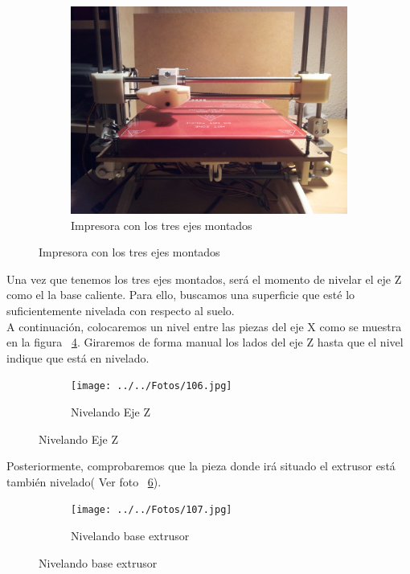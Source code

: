 		\begin{figure}[H]
		        \centering
		        \begin{subfigure}[htb]{0.5\textwidth}
		                \centering
		                \includegraphics[width=\textwidth]{../../Fotos/94.jpg}
		                \caption{Impresora con los tres ejes montados}
		                \label{fig:23.z}
		        \end{subfigure}
		\end{figure}
		Una vez que tenemos los tres ejes montados, será el momento de nivelar  el eje Z como el la base caliente. Para ello, buscamos una superficie que esté lo suficientemente nivelada con respecto al suelo.\\
		A continuación, colocaremos un nivel entre las piezas del eje X como se muestra en la figura ~\ref{fig:25.z}. Giraremos de forma manual los lados del eje Z hasta que el nivel indique que está en nivelado.\\
		\begin{figure}[H]
		        \centering
		        \begin{subfigure}[htb]{0.5\textwidth}
		                \centering
		                \texttt{[image: ../../Fotos/106.jpg]}
		                \caption{Nivelando Eje Z }
		                \label{fig:25.z}
		        \end{subfigure}
		\end{figure}
		Posteriormente, comprobaremos que la pieza donde irá situado el extrusor está también nivelado( Ver foto ~\ref{fig:26.z}).
		\begin{figure}[H]
		        \centering
		        \begin{subfigure}[htb]{0.5\textwidth}
		                \centering
		                \texttt{[image: ../../Fotos/107.jpg]}
		                \caption{Nivelando base extrusor }
		                \label{fig:26.z}
		        \end{subfigure}
		\end{figure}
